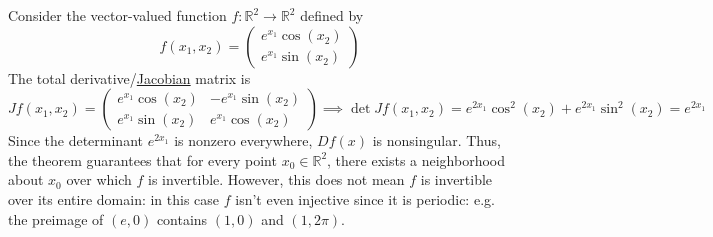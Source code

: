   \begin{example}
    \label{ex:total-derivative-of-a-vector-valued-function}
		Consider the vector-valued function $f: \mathbb{R}^2 \to \mathbb{R}^2$ defined by 
		\begin{equation}
		  f(x_1, x_2) = \begin{pmatrix}
		  		e^{x_1}\cos (x_2) \\ e^{x_1} \sin(x_2)
		  		\end{pmatrix}
		\end{equation}
		The total derivative/\hyperref[def:jacobian]{Jacobian} matrix is 
		\begin{equation}
		  J f(x_1, x_2) = \begin{pmatrix}
		  		e^{x_1} \cos(x_2) & - e^{x_1} \sin(x_2) \\
		  		e^{x_1} \sin(x_2) & e^{x_1} \cos(x_2)
		  		\end{pmatrix} \implies \det J f(x_1, x_2) = e^{2x_1} \cos^2 (x_2) + e^{2x_1} \sin^2 (x_2) = e^{2x_1}
		\end{equation}
		Since the determinant $e^{2x_1}$ is nonzero everywhere, $D f(x)$ is nonsingular. Thus, the theorem guarantees that for every point $x_0 \in \mathbb{R}^2$, there exists a neighborhood about $x_0$ over which $f$ is invertible. However, this does not mean $f$ is invertible over its entire domain: in this case $f$ isn't even injective since it is periodic: e.g. the preimage of $(e, 0)$ contains $(1, 0)$ and $(1, 2\pi)$. 
  \end{example}

